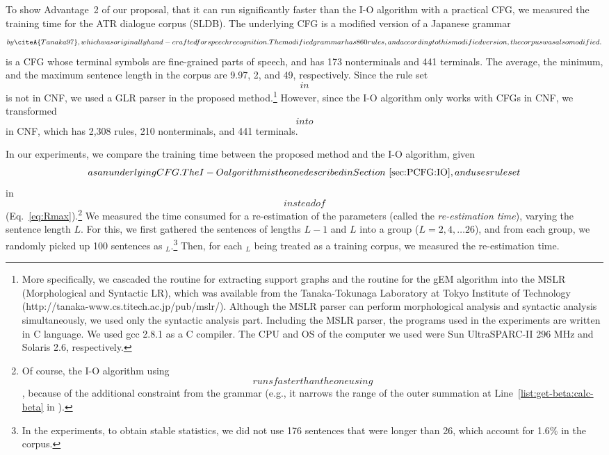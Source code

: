\documentclass[english]{jnlp_1.4_rep}
\newcommand{\corpus}{}
\newcommand{\Rmax}{}
\newcommand{\Gtanaka}{}
\newcommand{\Rtanaka}{}
\newcommand{\Gchom}{}
\newcommand{\Rchom}{}
\newcommand{\proc}[1]{}
\begin{document}
To show Advantage~2 of our proposal, that it can run
significantly faster than the I-O algorithm with a practical
CFG, we measured the training time for the ATR dialogue corpus (SLDB).
The underlying CFG is a modified version of a Japanese grammar
$\Gtanaka$ by \citeA{Tanaka97}, which was originally hand-crafted
for speech recognition.
The modified grammar has 860 rules, and according to this
modified version, the corpus was also modified.
$\Gtanaka$ is a CFG whose terminal symbols are fine-grained
parts of speech, and has 173 nonterminals and 441 terminals.
The average, the minimum, and the maximum
sentence length in the corpus are 9.97, 2, and 49,
respectively.  Since the rule set $\Rtanaka$ in $\Gtanaka$
is not in CNF, we used a GLR parser
in the proposed method.\footnote{
More specifically, we cascaded the routine for extracting
support graphs and the routine for the gEM algorithm into
the MSLR (Morphological and Syntactic LR), which was available
from the Tanaka-Tokunaga Laboratory at Tokyo Institute of Technology
(http://tanaka-www.cs.titech.ac.jp/pub/mslr/).
Although the MSLR parser can perform morphological analysis
and syntactic analysis simultaneously, we used only the
syntactic analysis part.  Including the MSLR parser, the programs
used in the experiments are written in C language.
We used gcc 2.8.1 as a C compiler.  The CPU and OS of the computer
we used were Sun UltraSPARC-II 296 MHz and Solaris 2.6, respectively.
} 
However, since the I-O algorithm only works with
CFGs in CNF, we transformed $\Gtanaka$ into $\Gchom$ in CNF,
which has 2,308 rules, 210 nonterminals, and 441 terminals.

In our experiments, we compare the training time between
the proposed method and the I-O algorithm, given $\Gtanaka$
as an underlying CFG.  The I-O algorithm is the one described
in Section~\ref{sec:PCFG:IO}, and uses rule set $\Rchom$
in $\Gchom$ instead of $\Rmax$ (Eq.~\ref{eq:Rmax}).\footnote{
Of course, the I-O algorithm using $\Rchom$ runs faster
than the one using $\Rmax$, because of the additional constraint from
the grammar (e.g., it narrows the range of the outer summation
at Line~\ref{list:get-beta:calc-beta} in $\proc{Get-Beta}$).
} 
We measured the time consumed for a re-estimation of the parameters
(called the {\em re-estimation time}),
varying the sentence length $L$.
For this, we first gathered the sentences of lengths $L-1$ and $L$
into a group ($L=2,4,\ldots 26$), and from each group, we randomly
picked up 100 sentences as $\corpus_L$.\footnote{
In the experiments, to obtain stable statistics, we did not use
176 sentences that were longer than 26, which account for 1.6\%
in the corpus.
}
Then, for each $\corpus_L$ being treated as a training corpus,
we measured the re-estimation time.
\end{document}
